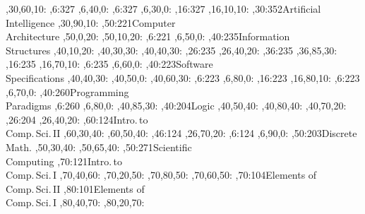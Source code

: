 \documentclass{article}
\begin{document}
\begin{center}
{,30,60,10:
,6:{327}
,6,40,0:
,6:{327}
,6,30,0:
,16:{327}
,16,10,10:
,30:{352}{Artificial\\ Intelligence}
,30,90,10:
,50:{221}{Computer\\ Architecture}
,50,0,20:
,50,10,20:
,6:{221}
,6,50,0:
,40:{235}{Information\\ Structures}
,40,10,20:
,40,30,30:
,40,40,30:
,26:{235}
,26,40,20:
,36:{235}
,36,85,30:
,16:{235}
,16,70,10:
,6:{235}
,6,60,0:
,40:{223}{Software\\ Specifications}
,40,40,30:
,40,50,0:
,40,60,30:
,6:{223}
,6,80,0:
,16:{223}
,16,80,10:
,6:{223}
,6,70,0:
,40:{260}{Programming\\ Paradigms}
,6:{260}
,6,80,0:
,40,85,30:
,40:{204}{Logic}
\ctdot
{},40,50,40:
,40,80,40:
\ctsolid
{},40,70,20:
,26:{204}
,26,40,20:
,60:{124}{Intro.\,to\\ Comp.\,Sci.\,II}
,60,30,40:
,60,50,40:
,46:{124}
,26,70,20:
,6:{124}
,6,90,0:
,50:{203}{Discrete\\ Math.}
,50,30,40:
,50,65,40:
,50:{271}{Scientific\\ Computing}
,70:{121}{Intro.\,to\\ Comp.\,Sci.\,I}
,70,40,60:
,70,20,50:
,70,80,50:
\ctdot
{},70,60,50:
\ctsolid
{},70:{104}{Elements of\\ Comp.\,Sci.\,II} 
,80:{101}{Elements of\\ Comp.\,Sci.\,I}
,80,40,70:
,80,20,70:
}
\end{center}
\end{document}

